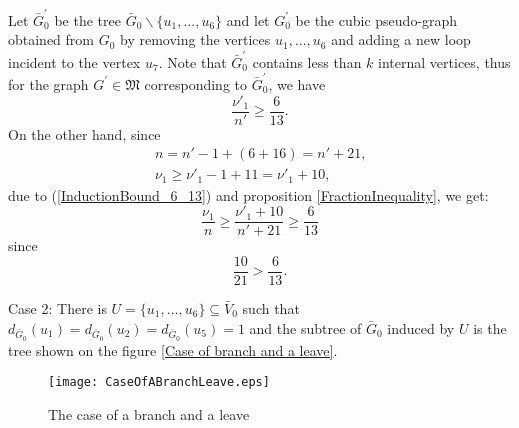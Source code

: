 \documentclass[fleqn,12pt,twoside]{article}
\newenvironment{proof}[1][Proof.]{\begin{trivlist}
\item[\hskip \labelsep {\bfseries #1}]}{\end{trivlist}}
\begin{document}
\begin{proof}
Let $\bar{G}_{0}^{\prime }$ be the tree $\bar{G}_{0}\backslash
\{u_{1},...,u_{6}\}$ and let $G_{0}^{\prime }$ be the cubic
pseudo-graph obtained from $G_{0}$ by removing the vertices
$u_{1},...,u_{6}$ and adding a new loop incident to the vertex
$u_{7}$. Note that $\bar{G}_{0}^{\prime }$ contains less than $k$
internal vertices, thus for the graph $G^{\prime }\in \mathfrak{M}$
corresponding to $\bar{G}_{0}^{\prime }$, we have
\begin{equation}
\frac{\nu' _{1}}{n'}\geq \frac{6}{13}. \label{InductionBound_6_13}
\end{equation}On the other hand, since
\begin{gather*}
n =n'-1+(6+16)=n'+21\text{,} \\
\nu _{1}\geq \nu' _{1}-1+11=\nu' _{1}+10,
\end{gather*}due to (\ref{InductionBound_6_13}) and proposition
\ref{FractionInequality}, we get:
\begin{equation*}
\frac{\nu _{1}}{n }\geq \frac{\nu' _{1}+10}{n'+21}\geq \frac{6}{13}
\end{equation*}since
\begin{equation*}
\frac{10}{21}>\frac{6}{13}.
\end{equation*}

Case 2: There is $U=\{u_{1},...,u_{6}\}\subseteq \bar{V}_{0}$ such that $d_{\bar{G}_{0}}(u_{1})=d_{\bar{G}_{0}}(u_{2})=d_{\bar{G}_{0}}(u_{5})=1$
and
the subtree of $\bar{G}_{0}$ induced by $U$ is the tree shown on the figure \ref{Case of branch and a leave}.

\begin{figure}[h]
\begin{center}
\texttt{[image: CaseOfABranchLeave.eps]}\\
\caption{The case of a branch and a leave}\label{Case of branch and
a leave}
\end{center}
\end{figure}


\end{proof}
\end{document}
